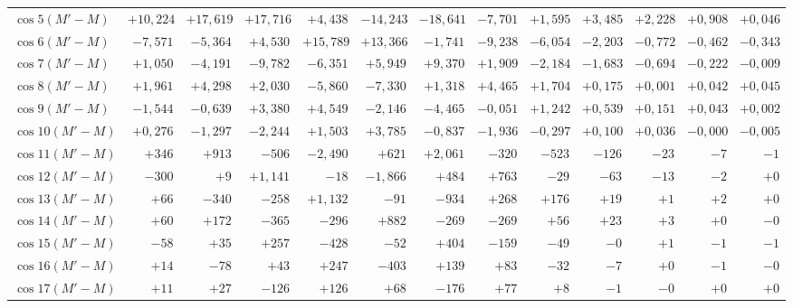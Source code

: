 \begin{landscape}
\begin{longtable}{@{}l|r|r|r|r|r|r|r|r|r|r|r|r@{}}
\(\cos 5(M'-M)\) & \(+10{,}224\) & \(+17{,}619\) & \(+17{,}716\) & \(+4{,}438\) & \(-14{,}243\) & \(-18{,}641\) & \(-7{,}701\) & \(+1{,}595\) & \(+3{,}485\) & \(+2{,}228\) & \(+0{,}908\) & \(+0{,}046\)\\
\(\cos 6(M'-M)\) & \(-7{,}571\) & \(-5{,}364\) & \(+4{,}530\) & \(+15{,}789\) & \(+13{,}366\) & \(-1{,}741\) & \(-9{,}238\) & \(-6{,}054\) & \(-2{,}203\) & \(-0{,}772\) & \(-0{,}462\) & \(-0{,}343\)\\
\(\cos 7(M'-M)\) & \(+1{,}050\) & \(-4{,}191\) & \(-9{,}782\) & \(-6{,}351\) & \(+5{,}949\) & \(+9{,}370\) & \(+1{,}909\) & \(-2{,}184\) & \(-1{,}683\) & \(-0{,}694\) & \(-0{,}222\) & \(-0{,}009\)\\
\(\cos 8(M'-M)\) & \(+1{,}961\) & \(+4{,}298\) & \(+2{,}030\) & \(-5{,}860\) & \(-7{,}330\) & \(+1{,}318\) & \(+4{,}465\) & \(+1{,}704\) & \(+0{,}175\) & \(+0{,}001\) & \(+0{,}042\) & \(+0{,}045\)\\
\(\cos 9(M'-M)\) & \(-1{,}544\) & \(-0{,}639\) & \(+3{,}380\) & \(+4{,}549\) & \(-2{,}146\) & \(-4{,}465\) & \(-0{,}051\) & \(+1{,}242\) & \(+0{,}539\) & \(+0{,}151\) & \(+0{,}043\) & \(+0{,}002\)\\
\(\cos 10(M'-M)\) & \(+0{,}276\) & \(-1{,}297\) & \(-2{,}244\) & \(+1{,}503\) & \(+3{,}785\) & \(-0{,}837\) & \(-1{,}936\) & \(-0{,}297\) & \(+0{,}100\) & \(+0{,}036\) & \(-0{,}000\) & \(-0{,}005\)\\
\(\cos 11(M'-M)\) & \(+346\) & \(+913\) & \(-506\) & \(-2{,}490\) & \(+621\) & \(+2{,}061\) & \(-320\) & \(-523\) & \(-126\) & \(-23\) & \(-7\) & \(-1\)\\
\(\cos 12(M'-M)\) & \(-300\) & \(+9\) & \(+1{,}141\) & \(-18\) & \(-1{,}866\) & \(+484\) & \(+763\) & \(-29\) & \(-63\) & \(-13\) & \(-2\) & \(+0\)\\
\(\cos 13(M'-M)\) & \(+66\) & \(-340\) & \(-258\) & \(+1{,}132\) & \(-91\) & \(-934\) & \(+268\) & \(+176\) & \(+19\) & \(+1\) & \(+2\) & \(+0\)\\
\(\cos 14(M'-M)\) & \(+60\) & \(+172\) & \(-365\) & \(-296\) & \(+882\) & \(-269\) & \(-269\) & \(+56\) & \(+23\) & \(+3\) & \(+0\) & \(-0\)\\
\(\cos 15(M'-M)\) & \(-58\) & \(+35\) & \(+257\) & \(-428\) & \(-52\) & \(+404\) & \(-159\) & \(-49\) & \(-0\) & \(+1\) & \(-1\) & \(-1\)\\
\(\cos 16(M'-M)\) & \(+14\) & \(-78\) & \(+43\) & \(+247\) & \(-403\) & \(+139\) & \(+83\) & \(-32\) & \(-7\) & \(+0\) & \(-1\) & \(-0\)\\
\(\cos 17(M'-M)\) & \(+11\) & \(+27\) & \(-126\) & \(+126\) & \(+68\) & \(-176\) & \(+77\) & \(+8\) & \(-1\) & \(-0\) & \(+0\) & \(+0\)\\

\end{longtable}
\end{landscape}
